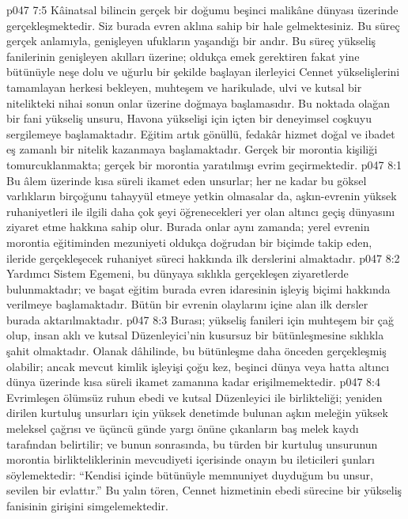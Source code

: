 \vs p047 7:5 Kâinatsal bilincin gerçek bir doğumu beşinci malikâne dünyası üzerinde gerçekleşmektedir. Siz burada evren aklına sahip bir hale gelmektesiniz. Bu süreç gerçek anlamıyla, genişleyen ufukların yaşandığı bir andır. Bu süreç yükseliş fanilerinin genişleyen akılları üzerine; oldukça emek gerektiren fakat yine bütünüyle neşe dolu ve uğurlu bir şekilde başlayan ilerleyici Cennet yükselişlerini tamamlayan herkesi bekleyen, muhteşem ve harikulade, ulvi ve kutsal bir nitelikteki nihai sonun onlar üzerine doğmaya başlamasıdır. Bu noktada olağan bir fani yükseliş unsuru, Havona yükselişi için içten bir deneyimsel coşkuyu sergilemeye başlamaktadır. Eğitim artık gönüllü, fedakâr hizmet doğal ve ibadet eş zamanlı bir nitelik kazanmaya başlamaktadır. Gerçek bir morontia kişiliği tomurcuklanmakta; gerçek bir morontia yaratılmışı evrim geçirmektedir.
\vs p047 8:1 Bu âlem üzerinde kısa süreli ikamet eden unsurlar; her ne kadar bu göksel varlıkların birçoğunu tahayyül etmeye yetkin olmasalar da, aşkın\hyp{}evrenin yüksek ruhaniyetleri ile ilgili daha çok şeyi öğrenecekleri yer olan altıncı geçiş dünyasını ziyaret etme hakkına sahip olur. Burada onlar aynı zamanda; yerel evrenin morontia eğitiminden mezuniyeti oldukça doğrudan bir biçimde takip eden, ileride gerçekleşecek ruhaniyet süreci hakkında ilk derslerini almaktadır.
\vs p047 8:2 Yardımcı Sistem Egemeni, bu dünyaya sıklıkla gerçekleşen ziyaretlerde bulunmaktadır; ve başat eğitim burada evren idaresinin işleyiş biçimi hakkında verilmeye başlamaktadır. Bütün bir evrenin olaylarını içine alan ilk dersler burada aktarılmaktadır.
\vs p047 8:3 Burası; yükseliş fanileri için muhteşem bir çağ olup, insan aklı ve kutsal Düzenleyici’nin kusursuz bir bütünleşmesine sıklıkla şahit olmaktadır. Olanak dâhilinde, bu bütünleşme daha önceden gerçekleşmiş olabilir; ancak mevcut kimlik işleyişi çoğu kez, beşinci dünya veya hatta altıncı dünya üzerinde kısa süreli ikamet zamanına kadar erişilmemektedir.
\vs p047 8:4 Evrimleşen ölümsüz ruhun ebedi ve kutsal Düzenleyici ile birlikteliği; yeniden dirilen kurtuluş unsurları için yüksek denetimde bulunan aşkın meleğin yüksek meleksel çağrısı ve üçüncü günde yargı önüne çıkanların baş melek kaydı tarafından belirtilir; ve bunun sonrasında, bu türden bir kurtuluş unsurunun morontia birlikteliklerinin mevcudiyeti içerisinde onayın bu ileticileri şunları söylemektedir: “Kendisi içinde bütünüyle memnuniyet duyduğum bu unsur, sevilen bir evlattır.” Bu yalın tören, Cennet hizmetinin ebedi sürecine bir yükseliş fanisinin girişini simgelemektedir.
